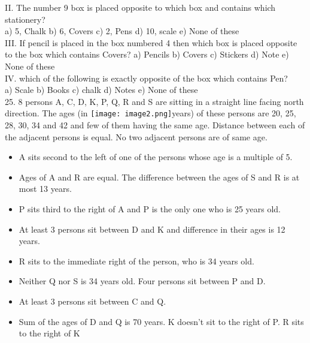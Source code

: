 \documentclass[
]{article}
\begin{document}
II. The number 9 box is placed opposite to which box and contains which stationery?\\
a) 5, Chalk \hspace{2mm}b) 6, Covers \hspace{2mm}c) 2, Pens \hspace{2mm}d) 10, scale \hspace{2mm}e) None of these\\

III. If pencil is placed in the box numbered 4 then which box is placed opposite to the box which
contains Covers?\hspace{2mm}
a) Pencils \hspace{2mm}b) Covers \hspace{2mm}c) Stickers \hspace{2mm}d) Note \hspace{2mm}e) None of these\\

IV. which of the following is exactly opposite of the box which contains Pen?\\
a) Scale \hspace{2mm}b) Books \hspace{2mm}\hspace{2mm}c) chalk \hspace{2mm}d) Notes \hspace{2mm}e) None of these\\

25. 8 persons A, C, D, K, P, Q, R and S are sitting in a straight line facing north direction. The
ages (in \texttt{[image: image2.png]}years) of these persons are 20, 25, 28, 30, 34 and 42 and few of them having the same
age. Distance between each of the adjacent persons is equal. No two adjacent persons are of
same age.\\
\begin{itemize}
\item A sits second to the left of one of the persons whose age is a multiple of 5.\\
\item Ages of A and R are equal. The difference between the ages of S and R is at most 13
years.\\
\item P sits third to the right of A and P is the only one who is 25 years old.\\
\item At least 3 persons sit between D and K and difference in their ages is 12 years.\\
\item R sits to the immediate right of the person, who is 34 years old.\\
\item Neither Q nor S is 34 years old. Four persons sit between P and D.\\
\item At least 3 persons sit between C and Q.\\
\item Sum of the ages of D and Q is 70 years. K doesn’t sit to the right of P. R sits to the
right of K\\
\end{itemize}
\end{document}
